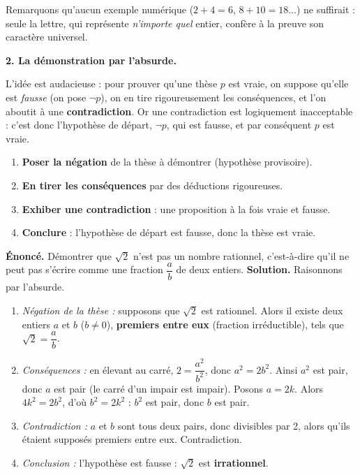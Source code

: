 \documentclass[11pt]{article}
\begin{document}
Remarquons qu'aucun exemple numérique ($2+4=6$, $8+10=18$...) ne suffirait : seule la lettre, qui représente \emph{n'importe quel} entier, confère à la preuve son caractère universel.

\textbf{2. La démonstration par l'absurde.}\par
L'idée est audacieuse : pour prouver qu'une thèse $p$ est vraie, on suppose qu'elle est \emph{fausse} (on pose $\neg p$), on en tire rigoureusement les conséquences, et l'on aboutit à une \textbf{contradiction}. Or une contradiction est logiquement inacceptable : c'est donc l'hypothèse de départ, $\neg p$, qui est fausse, et par conséquent $p$ est vraie.

\begin{methode}
\begin{enumerate}
\item \textbf{Poser la négation} de la thèse à démontrer (hypothèse provisoire).
\item \textbf{En tirer les conséquences} par des déductions rigoureuses.
\item \textbf{Exhiber une contradiction} : une proposition à la fois vraie et fausse.
\item \textbf{Conclure} : l'hypothèse de départ est fausse, donc la thèse est vraie.
\end{enumerate}
\end{methode}

\begin{exoresolu}
\textbf{Énoncé.} Démontrer que $\sqrt{2}$ n'est pas un nombre rationnel, c'est-à-dire qu'il ne peut pas s'écrire comme une fraction $\dfrac{a}{b}$ de deux entiers.
\tcblower
\textbf{Solution.} Raisonnons par l'absurde.
\begin{enumerate}
\item \emph{Négation de la thèse :} supposons que $\sqrt{2}$ est rationnel. Alors il existe deux entiers $a$ et $b$ ($b \neq 0$), \textbf{premiers entre eux} (fraction irréductible), tels que $\sqrt{2} = \dfrac{a}{b}$.
\item \emph{Conséquences :} en élevant au carré, $2 = \dfrac{a^2}{b^2}$, donc $a^2 = 2b^2$. Ainsi $a^2$ est pair, donc $a$ est pair (le carré d'un impair est impair). Posons $a = 2k$. Alors $4k^2 = 2b^2$, d'où $b^2 = 2k^2$ : $b^2$ est pair, donc $b$ est pair.
\item \emph{Contradiction :} $a$ et $b$ sont tous deux pairs, donc divisibles par 2, alors qu'ils étaient supposés premiers entre eux. Contradiction.
\item \emph{Conclusion :} l'hypothèse est fausse : $\sqrt{2}$ est \textbf{irrationnel}.
\end{enumerate}
\end{exoresolu}
\end{document}

